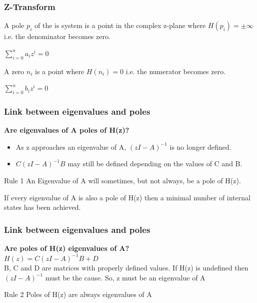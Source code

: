 \begin{frame}
	\frametitle{Z-Transform}
	\begin{definition}
		A pole $p_i$ of the is system is a point in the complex z-plane where $H(p_i) = \pm \infty$ i.e. the denominator becomes zero.\\
		\begin{center}
			$\sum\limits_{i=0}^{n}a_iz^{i} = 0$
		\end{center}
	\end{definition}
	\begin{definition}
		A zero $n_i$ is a point where $H(n_i)=0$ i.e. the numerator becomes zero.\\
		\begin{center}
			$\sum\limits_{i=0}^{n}b_iz^{i} = 0$
		\end{center}
	\end{definition}
\end{frame}
\begin{frame}
	\frametitle{Link between eigenvalues and poles}
	\textbf{Are eigenvalues of A poles of H(z)?}\\
	\small{
	\begin{itemize}
			\item As z approaches an eigenvalue of A, $(zI-A)^{-1}$ is no longer defined.\\
			\item $C(zI-A)^{-1}B$	may still be defined depending on the values of C and B.
	\end{itemize}
}
	\begin{block}{Rule 1}
			An Eigenvalue of A will sometimes, but not always, be a pole of H(z).
	\end{block}
	\begin{definition}
		If every eigenvalue of A is also a pole of H(z) then a minimal number of internal states has been achieved.
	\end{definition}
	
	
\end{frame}
\begin{frame}
	\frametitle{Link between eigenvalues and poles}
	\textbf{Are poles of H(z) eigenvalues of A?}\\
	$H(z) = C(zI-A)^{-1}B + D$ \\
	B, C and D are matrices with properly defined values.
	If H(z) is undefined then $(zI-A)^{-1}$ must be the cause. So,
	z must be an eigenvalue of A
	\begin{block}{Rule 2}
		Poles of H(z) are always eigenvalues of A 
	\end{block}
\end{frame}
